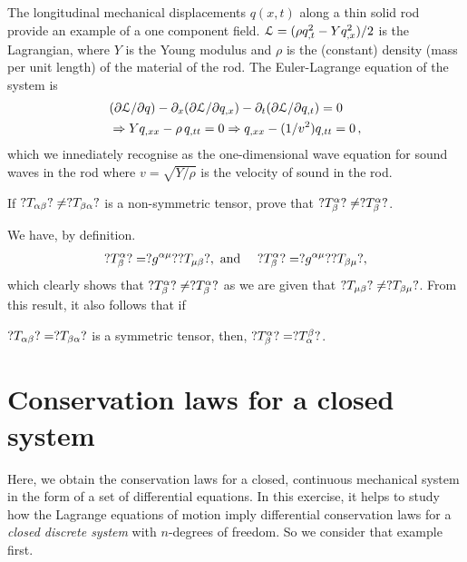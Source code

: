   

\soln The longitudinal mechanical displacements  $q(x,t)$ 
along a thin solid rod provide an example of a one 
component 
field. $\EuScript{L}=(\rho q_{,t}^2 - Y q_{,x}^2 )/2$ is 
the 
Lagrangian, where  $Y$ is the Young modulus and $\rho$ is 
the (constant) density (mass per unit length) of the 
material of the rod. The Euler-Lagrange equation of the 
system is
\begin{align*}
&({\partial} \EuScript{L}/{\partial} q)
 -{\partial}_x({\partial} \EuScript{L}/{\partial} q_{,x})
-{\partial}_t({\partial} \EuScript{L}/{\partial} q_{,t})=0\\ 
&\Rightarrow Y q_{,xx}-\rho\,
q_{,tt}=0 \Rightarrow
q_{,xx}-(1/v^2) q_{,tt}=0\,,
\end{align*}
which we innediately recognise as the one-dimensional wave 
equation for sound waves in the rod where  $v=\sqrt{Y/\rho} 
$ is the {velocity of sound} in the rod.\ebx

\exm If $?T_{{\alpha}{\beta}}?\neq ?T_{{\beta}{\alpha}}?$ is a 
non-symmetric tensor,   prove that  $?T^{{\alpha}}_{{\beta}}?\neq 
?T_{{\beta}}^{{\alpha}}?$.

\soln We have, by definition.
\begin{align} \label{rcm.116}
?T^{{\alpha}}_{{\beta}}?= ?g^{{\alpha}{\mu}}? ?T_{{\mu}{\beta}}?, \text{
and }\quad
 ?T_{{\beta}}^{{\alpha}}?= ?g^{{\alpha}{\mu}}? ?T_{{\beta}{\mu}}?,
 \end{align}
which clearly shows that $?T^{{\alpha}}_{{\beta}}?\neq 
?T_{{\beta}}^{{\alpha}}?$ as we are given that $?T_{{\mu}{\beta}}? 
\neq 
?T_{{\beta}{\mu}}? $. From this result, it also follows that if 
 
 $?T_{{\alpha}{\beta}}?=?T_{{\beta}{\alpha}}?$ is a symmetric tensor, 
then, $?T^{{\alpha}}_{{\beta}}?=?T^{{\beta}}_{{\alpha}}?$.\ebx

\section{Conservation laws for a  closed 
system}
Here, we obtain the conservation laws for a closed,   
continuous mechanical system in the form of a set of   
differential equations. In this exercise, it helps to study 
how the Lagrange equations of motion imply    differential  
conservation laws for  a \textsl{closed discrete system} 
with $n$-degrees of freedom. So we consider that example 
first.


